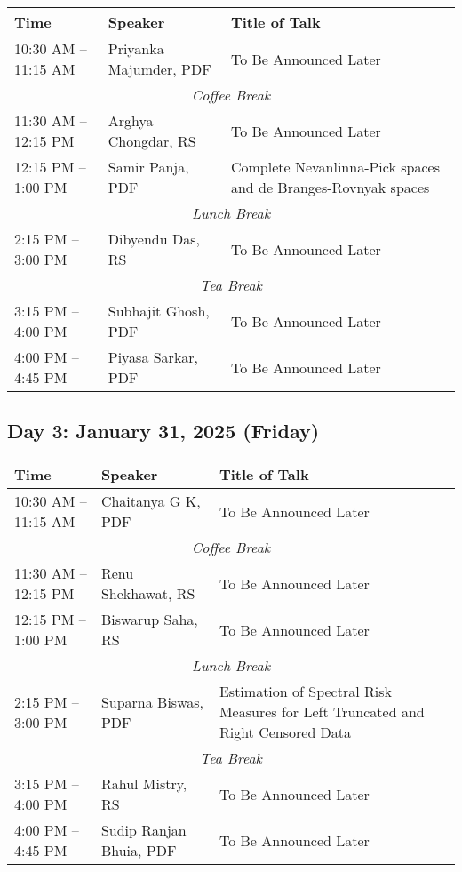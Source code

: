 \noindent
\renewcommand{\arraystretch}{1.5} %
\begin{tabular}{|p{3.5cm}|p{4cm}|p{7cm}|}
	\hline
	\textbf{Time} & \textbf{Speaker} & \textbf{Title of Talk} \\
	\hline
	10:30 AM -- 11:15 AM & Priyanka Majumder, PDF & To Be Announced Later \\
	\hline
	\multicolumn{3}{|c|}{\textit{Coffee Break}} \\
	\hline
	11:30 AM -- 12:15 PM & Arghya Chongdar, RS & To Be Announced Later \\
	\hline
	12:15 PM -- 1:00 PM & Samir Panja, PDF & Complete Nevanlinna-Pick spaces and de Branges-Rovnyak spaces \\
	\hline
	\multicolumn{3}{|c|}{\textit{Lunch Break}} \\
	\hline
	2:15 PM -- 3:00 PM & Dibyendu Das, RS & To Be Announced Later \\
	\hline
	\multicolumn{3}{|c|}{\textit{Tea Break}} \\
	\hline
	3:15 PM -- 4:00 PM & Subhajit Ghosh, PDF & To Be Announced Later \\
	\hline
	4:00 PM -- 4:45 PM & Piyasa Sarkar, PDF & To Be Announced Later \\
	\hline

\end{tabular}

\subsection*{Day 3: January 31, 2025 (Friday)}

\noindent
\renewcommand{\arraystretch}{1.5} %
\begin{tabular}{|p{3.5cm}|p{4cm}|p{7cm}|}
	\hline
	\textbf{Time} & \textbf{Speaker} & \textbf{Title of Talk} \\
	\hline
	10:30 AM -- 11:15 AM & Chaitanya G K, PDF & To Be Announced Later \\
	\hline
	\multicolumn{3}{|c|}{\textit{Coffee Break}} \\
	\hline
	11:30 AM -- 12:15 PM & Renu Shekhawat, RS & To Be Announced Later \\
	\hline
	12:15 PM -- 1:00 PM & Biswarup Saha, RS & To Be Announced Later \\
	\hline
	\multicolumn{3}{|c|}{\textit{Lunch Break}} \\
	\hline
	2:15 PM -- 3:00 PM & Suparna Biswas, PDF & Estimation of Spectral Risk Measures for Left Truncated and Right Censored Data \\
	\hline
	\multicolumn{3}{|c|}{\textit{Tea Break}} \\
	\hline
	3:15 PM -- 4:00 PM & Rahul Mistry, RS & To Be Announced Later \\
	\hline

	4:00 PM -- 4:45 PM & Sudip Ranjan Bhuia, PDF & To Be Announced Later \\
	\hline
\end{tabular}
